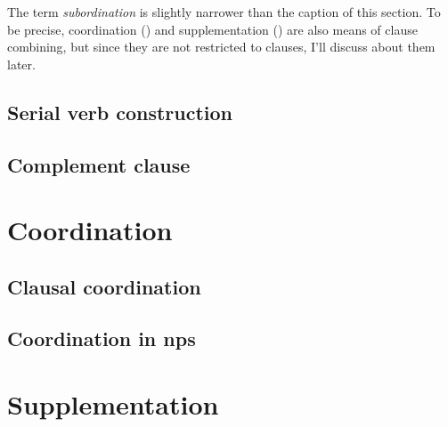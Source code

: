 \documentclass[UTF8, a4paper, oneside, scheme=plain]{ctexart}
\newcommand*{\term}[1]{\emph{#1}}
\begin{document}
The term \term{subordination} is slightly narrower than the caption of this section.
To be precise,
coordination () and supplementation () 
are also means of clause combining,
but since they are not restricted to clauses,
I'll discuss about them later.

\subsection{Serial verb construction}

\subsection{Complement clause}

\section{Coordination}\label{sec:coord}

\subsection{Clausal coordination}\label{sec:clause-coord}

\subsection{Coordination in \ac{np}s}

\section{Supplementation}\label{sec:clause-supp}



\end{document}
